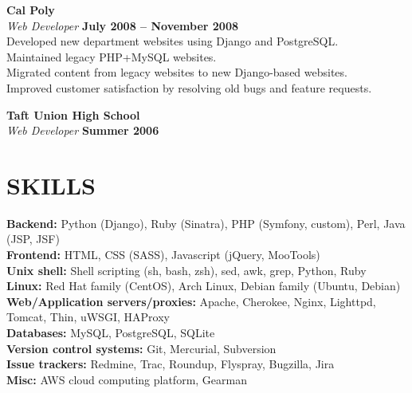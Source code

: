 \documentclass[margin,line]{resume}
\begin{document}
\begin{resume}
    \textbf{\listing Cal Poly} \vspace{2mm}\\\vspace{1mm}%
    \textsl{Web Developer} \hfill \textbf{July 2008 -- November 2008}\\
    Developed new department websites using Django and PostgreSQL.\\
    Maintained legacy PHP+MySQL websites.\\
    Migrated content from legacy websites to new Django-based websites.\\
    Improved customer satisfaction by resolving old bugs and feature requests.

    \textbf{\listing Taft Union High School} \vspace{2mm}\\\vspace{1mm}%
    \textsl{Web Developer} \hfill \textbf{Summer 2006}\\

\sectionline

    \section{\mysidestyle \textbf{\large{S}\small{KILLS}}}

    \textbf{Backend:} Python (Django), Ruby (Sinatra), PHP (Symfony, custom), Perl, Java (JSP, JSF)\\
    \textbf{Frontend:} HTML, CSS (SASS), Javascript (jQuery, MooTools)\\
    \textbf{Unix shell:} Shell scripting (sh, bash, zsh), sed, awk, grep, Python, Ruby\\
    \textbf{Linux:} Red Hat family (CentOS), Arch Linux, Debian family (Ubuntu, Debian)\\
    \textbf{Web/Application servers/proxies:} Apache, Cherokee, Nginx, Lighttpd, Tomcat, Thin, uWSGI, HAProxy\\
    \textbf{Databases:} MySQL, PostgreSQL, SQLite\\
    \textbf{Version control systems:} Git, Mercurial, Subversion\\
    \textbf{Issue trackers:} Redmine, Trac, Roundup, Flyspray, Bugzilla, Jira\\
    \textbf{Misc:} AWS cloud computing platform, Gearman


\end{resume}
\end{document}
